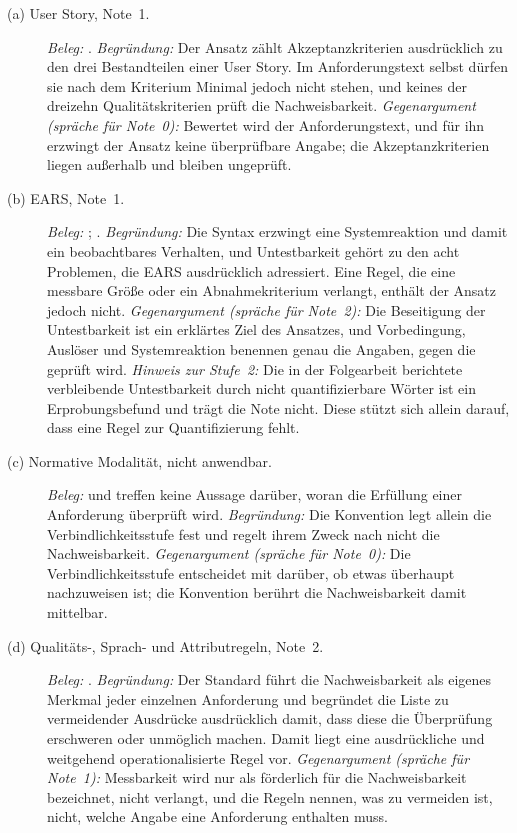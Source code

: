 \documentclass[11pt,a4paper]{report}
\begin{document}
\begin{description}
  \item[(a) User Story, Note~1.]
  \emph{Beleg:} \cite[Abschn.~1, 3.1.3 und Tab.~1]{lucassen2016qus}.
  \emph{Begründung:} Der Ansatz zählt Akzeptanzkriterien ausdrücklich zu
  den drei Bestandteilen einer User Story. Im Anforderungstext selbst
  dürfen sie nach dem Kriterium Minimal jedoch nicht stehen, und keines
  der dreizehn Qualitätskriterien prüft die Nachweisbarkeit.
  \emph{Gegenargument (spräche für Note~0):} Bewertet wird der
  Anforderungstext, und für ihn erzwingt der Ansatz keine überprüfbare
  Angabe; die Akzeptanzkriterien liegen außerhalb und bleiben
  ungeprüft.

  \item[(b) EARS, Note~1.]
  \emph{Beleg:} \cite[Abschn.~2 und 4.1]{mavin2009ears};
  \cite[Abschn.~Residual Problems]{mavin2010bigears}.
  \emph{Begründung:} Die Syntax erzwingt eine Systemreaktion und damit
  ein beobachtbares Verhalten, und Untestbarkeit gehört zu den acht
  Problemen, die EARS ausdrücklich adressiert. Eine Regel, die eine
  messbare Größe oder ein Abnahmekriterium verlangt, enthält der Ansatz
  jedoch nicht.
  \emph{Gegenargument (spräche für Note~2):} Die Beseitigung der
  Untestbarkeit ist ein erklärtes Ziel des Ansatzes, und Vorbedingung,
  Auslöser und Systemreaktion benennen genau die Angaben, gegen die
  geprüft wird.
  \emph{Hinweis zur Stufe~2:} Die in der Folgearbeit berichtete
  verbleibende Untestbarkeit durch nicht quantifizierbare Wörter ist ein
  Erprobungsbefund und trägt die Note nicht. Diese stützt sich allein
  darauf, dass eine Regel zur Quantifizierung fehlt.

  \item[(c) Normative Modalität, nicht anwendbar.]
  \emph{Beleg:} \cite{rfc2119} und \cite{rfc8174} treffen keine Aussage
  darüber, woran die Erfüllung einer Anforderung überprüft wird.
  \emph{Begründung:} Die Konvention legt allein die
  Verbindlichkeitsstufe fest und regelt ihrem Zweck nach nicht die
  Nachweisbarkeit.
  \emph{Gegenargument (spräche für Note~0):} Die Verbindlichkeitsstufe
  entscheidet mit darüber, ob etwas überhaupt nachzuweisen ist; die
  Konvention berührt die Nachweisbarkeit damit mittelbar.

  \item[(d) Qualitäts-, Sprach- und Attributregeln, Note~2.]
  \emph{Beleg:} \cite[Abschn.~5.2.5 und 5.2.7]{iso29148}.
  \emph{Begründung:} Der Standard führt die Nachweisbarkeit als eigenes
  Merkmal jeder einzelnen Anforderung und begründet die Liste zu
  vermeidender Ausdrücke ausdrücklich damit, dass diese die
  Überprüfung erschweren oder unmöglich machen. Damit liegt eine
  ausdrückliche und weitgehend operationalisierte Regel vor.
  \emph{Gegenargument (spräche für Note~1):} Messbarkeit wird nur als
  förderlich für die Nachweisbarkeit bezeichnet, nicht verlangt, und die
  Regeln nennen, was zu vermeiden ist, nicht, welche Angabe eine
  Anforderung enthalten muss.
\end{description}
\end{document}
